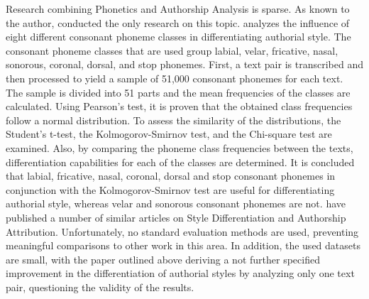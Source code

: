 Research combining Phonetics and Authorship Analysis is sparse.
As known to the author, \citeauthor{khomytska2019nonparametric} conducted the only research on this topic.
\cite{khomytska2019nonparametric} analyzes the influence of eight different consonant phoneme classes in differentiating authorial style.
The consonant phoneme classes that are used group labial, velar, fricative, nasal, sonorous, coronal, dorsal, and stop phonemes.
First, a text pair is transcribed and then processed to yield a sample of 51,000 consonant phonemes for each text.
The sample is divided into 51 parts and the mean frequencies of the classes are calculated.
Using Pearson's test, it is proven that the obtained class frequencies follow a normal distribution.
To assess the similarity of the distributions, the Student's t-test, the Kolmogorov-Smirnov test, and the Chi-square test are examined.
Also, by comparing the phoneme class frequencies between the texts, differentiation capabilities for each of the classes are determined.
It is concluded that labial, fricative, nasal, coronal, dorsal and  stop consonant phonemes in conjunction with the Kolmogorov-Smirnov test are useful for differentiating authorial style, whereas velar and sonorous consonant phonemes are not.
\citeauthor{khomytska2019nonparametric} have published a number of similar articles on Style Differentiation and Authorship Attribution.
Unfortunately, no standard evaluation methods are used, preventing meaningful comparisons to other work in this area.
In addition, the used datasets are small, with the paper outlined above deriving a not further specified improvement in the differentiation of authorial styles by analyzing only one text pair, questioning the validity of the results.\newline

